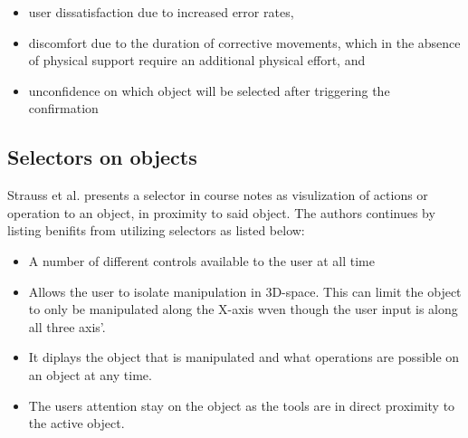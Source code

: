 \begin{itemize}
\item user dissatisfaction due to increased error rates,
\item discomfort due to the duration of corrective movements, which in the absence of physical support require an additional physical effort, and
\item unconfidence on which object will be selected after triggering the confirmation
\end{itemize}

\subsection{Selectors on objects}
Strauss et al. presents a selector in course notes as visulization of actions or operation to an object, in proximity to said object.\cite{tools:strauss2002design} The authors continues by listing benifits from utilizing selectors as listed below:
\begin{itemize}
  \item A number of different controls available to the user at all time
  \item Allows the user to isolate manipulation in 3D-space. This can limit the object to only be manipulated along the X-axis wven though the user input is along all three axis'.
  \item It diplays the object that is manipulated and what operations are possible on an object at any time.
  \item The users attention stay on the object as the tools are in direct proximity to the active object.

\end{itemize}
